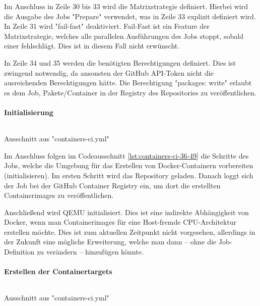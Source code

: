 Im Anschluss in Zeile 30 bis 33 wird die Matrixstrategie definiert. Hierbei wird die Ausgabe des Jobs "Prepare" verwendet, was in Zeile 33 explizit definiert wird. In Zeile 31 wird "fail-fast" deaktiviert. Fail-Fast ist ein Feature der Matrixstrategie, welches alle parallelen Ausführungen des Jobs stoppt, sobald einer fehlschlägt. Dies ist in diesem Fall nicht erwünscht.

In Zeile 34 und 35 werden die benötigten Berechtigungen definiert. Dies ist zwingend notwendig, da ansonsten der GitHub API-Token nicht die ausreichenden Berechtigungen hätte. Die Berechtigung "packages: write" erlaubt es dem Job, Pakete/Container in der Registry des Repositories zu veröffentlichen.

\paragraph{Initialisierung}

\begin{listing}[H]
    \inputminted[firstline=36,lastline=49]{yaml}{./code-examples/containers-ci.yml}
    \caption{Ausschnitt aus "containers-ci.yml"}
    \label{lst:containers-ci-36-49}
\end{listing}

Im Anschluss folgen im Codeausschnitt \cref{lst:containers-ci-36-49} die Schritte des Jobs, welche die Umgebung für das Erstellen von Docker-Containern vorbereiten (initialisieren). Im ersten Schritt wird das Repository geladen. Danach loggt sich der Job bei der GitHub Container Registry ein, um dort die erstellten Containerimages zu veröffentlichen. 

Anschließend wird QEMU initialisiert. Dies ist eine indirekte Abhängigkeit von Docker, wenn man Containerimages für eine Host-fremde CPU-Architektur erstellen möchte. Dies ist zum aktuellen Zeitpunkt nicht vorgesehen, allerdings in der Zukunft eine mögliche Erweiterung, welche man dann – ohne die Job-Definition zu verändern – hinzufügen könnte.



\paragraph{Erstellen der Containertargets}

\begin{listing}[H]
    \inputminted[firstline=50,lastline=60]{yaml}{./code-examples/containers-ci.yml}
    \caption{Ausschnitt aus "containers-ci.yml"}
    \label{lst:containers-ci-50-60}
\end{listing}
\FloatBarrier

